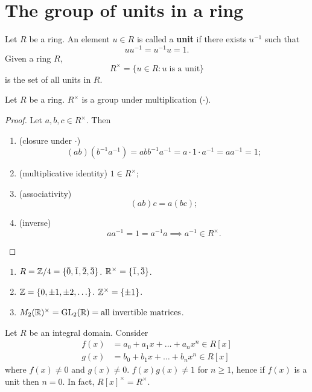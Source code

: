 \section{The group of units in a ring}

\begin{definition}[Unit]
    Let $R$ be a ring. An element $u \in R$ is called a \textbf{unit} if there exists $u^{-1}$ such that
    \[ uu^{-1} = u^{-1}u = 1. \]
    Given a ring $R$,
    \[ R^\times = \{ u \in R : u \;\text{is a unit}\} \]
    is the set of all units in $R$.
\end{definition}

\begin{proposition}
    Let $R$ be a ring. $R^\times$ is a group under multiplication ($\cdot$).
\end{proposition}

\begin{proof}
    Let $a, b, c \in R^\times$. Then
    \begin{enumerate}
        \item (closure under $\cdot$)
            \[ (ab)(b^{-1}a^{-1}) = abb^{-1}a^{-1} = a \cdot 1 \cdot a^{-1} = aa^{-1} = 1; \]
        \item (multiplicative identity) $1 \in R^\times$;
        \item (associativity)
            \[ (ab)c = a(bc); \]
        \item (inverse)
            \[ aa^{-1} = 1 = a^{-1}a \implies a^{-1} \in R^\times. \]
    \end{enumerate}
\end{proof}

\begin{example}
    \begin{enumerate}
        \item $R = \mathbb{Z}/4 = \{ \bar 0, \bar 1, \bar 2, \bar 3 \}$. $\mathbb{R}^\times = \{ \bar 1, \bar 3 \}$.
        \item $\mathbb{Z} = \{0, \pm 1, \pm 2, \ldots \}$. $\mathbb{Z}^\times = \{ \pm 1 \}$.
        \item $M_2(\mathbb{R})^\times = \operatorname{GL}_2(\mathbb{R}) = \text{all invertible matrices}$.
    \end{enumerate}
\end{example}

\begin{example}
    Let $R$ be an integral domain. Consider
    \begin{align*}
        f(x) &= a_0 + a_1x + \ldots + a_nx^n \in R[x] \\
        g(x) &= b_0 + b_1x + \ldots + b_nx^n \in R[x]
    \end{align*}
where $f(x) \neq 0$ and $g(x) \neq 0$. $f(x)g(x) \neq 1$ for $n \geq 1$, hence if $f(x)$ is a unit then $n = 0$. In fact, $R[x]^\times = R^\times$.
\end{example}

